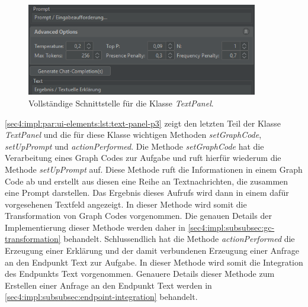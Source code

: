 \begin{figure}[!ht]
  \includegraphics[width=0.9\textwidth]{chapter/chapter_4/wireframe-impl-text-complete}
  \caption{Vollständige Schnittstelle für die Klasse \textit{TextPanel}.}
  \label{sec4:impl:par:ui-elements:fig:wireframe-text-complete}
\end{figure}



\cref{sec4:impl:par:ui-elements:lst:text-panel-p3} zeigt den letzten Teil der Klasse \textit{TextPanel} und die für diese Klasse wichtigen Methoden \textit{setGraphCode}, \textit{setUpPrompt} und \textit{actionPerformed}.
Die Methode \textit{setGraphCode} hat die Verarbeitung eines Graph Codes zur Aufgabe und ruft hierfür wiederum die Methode \textit{setUpPrompt} auf.
Diese Methode ruft die Informationen in einem Graph Code ab und erstellt aus diesen eine Reihe an Textnachrichten, die zusammen eine Prompt darstellen.
Das Ergebnis dieses Aufrufs wird dann in einem dafür vorgesehenen Textfeld angezeigt.
In dieser Methode wird somit die Transformation von Graph Codes vorgenommen.
Die genauen Details der Implementierung dieser Methode werden daher in \cref{sec4:impl:subsubsec:gc-transformation} behandelt.
Schlussendlich hat die Methode \textit{actionPerformed} die Erzeugung einer Erklärung und der damit verbundenen Erzeugung einer Anfrage an den Endpunkt Text zur Aufgabe.
In dieser Methode wird somit die Integration des Endpunkts Text vorgenommen.
Genauere Details dieser Methode zum Erstellen einer Anfrage an den Endpunkt Text werden in \cref{sec4:impl:subsubsec:endpoint-integration} behandelt.

